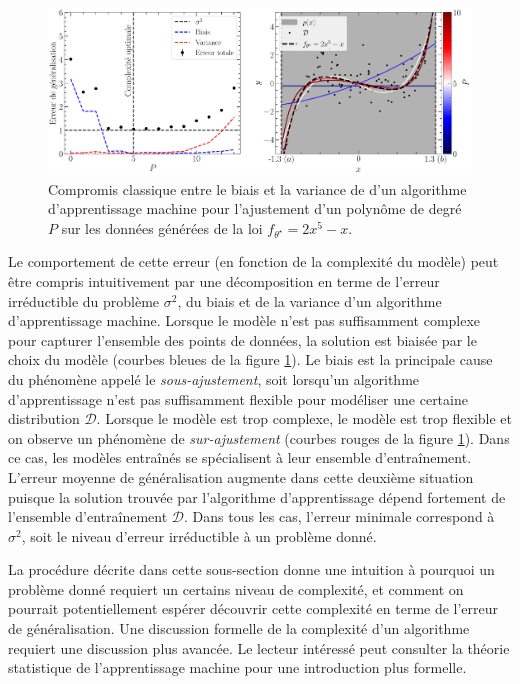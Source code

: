 \begin{figure}[t]
        \centering
        \includegraphics[width=\textwidth]{notebooks/bias_variance.pdf}
        \caption{Compromis classique entre le biais et la variance de d'un algorithme d'apprentissage machine pour l'ajustement d'un polynôme de degré $P$ sur les données générées de la 
        loi $f_{\theta^\star} = 2x^5 - x$.}
        \label{fig:bias_variance}
\end{figure}

Le comportement de cette erreur (en fonction de la complexité du modèle) 
peut être compris intuitivement par une décomposition en terme de l'erreur irréductible du problème 
$\sigma^2$, du biais et de la variance d'un algorithme d'apprentissage machine.
Lorsque le modèle n'est pas suffisamment complexe pour capturer l'ensemble des points de données, la solution est biaisée par le choix du modèle (courbes bleues de la 
figure \ref{fig:bias_variance}). Le biais est la principale cause du phénomène appelé le \textit{sous-ajustement}, soit lorsqu'un algorithme d'apprentissage n'est pas suffisamment 
flexible pour modéliser une certaine distribution $\mathcal{D}$. Lorsque le modèle est trop complexe, 
le modèle est trop flexible et on observe un phénomène de \textit{sur-ajustement} (courbes rouges de la figure \ref{fig:bias_variance}). Dans ce cas, les modèles entraînés se spécialisent 
à leur ensemble d'entraînement. L'erreur moyenne de généralisation augmente dans cette deuxième situation 
puisque la solution trouvée par l'algorithme d'apprentissage dépend fortement de l'ensemble d'entraînement $\mathcal{D}$.
Dans tous les cas, l'erreur minimale correspond à $\sigma^2$, soit le niveau d'erreur irréductible à un problème donné.

La procédure décrite dans cette sous-section donne une intuition à pourquoi un problème donné requiert un certains niveau de complexité, et 
comment on pourrait potentiellement espérer découvrir cette complexité en terme de l'erreur de généralisation.  
Une discussion formelle de la complexité d'un algorithme requiert une discussion plus avancée. Le lecteur intéressé peut consulter la théorie 
statistique de l'apprentissage machine pour une introduction plus formelle.

